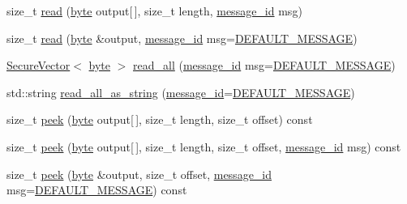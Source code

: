 \begin{DoxyCompactItemize}
\item 
size\-\_\-t \hyperlink{classBotan_1_1Pipe_a6e56c732acd4bd44cecfb92eedd68ddf}{read} (\hyperlink{namespaceBotan_a7d793989d801281df48c6b19616b8b84}{byte} output\mbox{[}$\,$\mbox{]}, size\-\_\-t length, \hyperlink{classBotan_1_1Pipe_a122c19120c1c21f270b6b6225ca9883c}{message\-\_\-id} msg)
\item 
size\-\_\-t \hyperlink{classBotan_1_1Pipe_a9b6aa6652c9c95bfc2e110315a7032c1}{read} (\hyperlink{namespaceBotan_a7d793989d801281df48c6b19616b8b84}{byte} \&output, \hyperlink{classBotan_1_1Pipe_a122c19120c1c21f270b6b6225ca9883c}{message\-\_\-id} msg=\hyperlink{classBotan_1_1Pipe_a75278149a3ca86f19db144049cfa2ed3}{D\-E\-F\-A\-U\-L\-T\-\_\-\-M\-E\-S\-S\-A\-G\-E})
\item 
\hyperlink{classBotan_1_1SecureVector}{Secure\-Vector}$<$ \hyperlink{namespaceBotan_a7d793989d801281df48c6b19616b8b84}{byte} $>$ \hyperlink{classBotan_1_1Pipe_a389294ef471311276912ef8eaf30daaa}{read\-\_\-all} (\hyperlink{classBotan_1_1Pipe_a122c19120c1c21f270b6b6225ca9883c}{message\-\_\-id} msg=\hyperlink{classBotan_1_1Pipe_a75278149a3ca86f19db144049cfa2ed3}{D\-E\-F\-A\-U\-L\-T\-\_\-\-M\-E\-S\-S\-A\-G\-E})
\item 
std\-::string \hyperlink{classBotan_1_1Pipe_adf442bf35a45a7b604903cf758f52772}{read\-\_\-all\-\_\-as\-\_\-string} (\hyperlink{classBotan_1_1Pipe_a122c19120c1c21f270b6b6225ca9883c}{message\-\_\-id}=\hyperlink{classBotan_1_1Pipe_a75278149a3ca86f19db144049cfa2ed3}{D\-E\-F\-A\-U\-L\-T\-\_\-\-M\-E\-S\-S\-A\-G\-E})
\item 
size\-\_\-t \hyperlink{classBotan_1_1Pipe_a48ceb1b846cf689cbc492168d87b27ad}{peek} (\hyperlink{namespaceBotan_a7d793989d801281df48c6b19616b8b84}{byte} output\mbox{[}$\,$\mbox{]}, size\-\_\-t length, size\-\_\-t offset) const 
\item 
size\-\_\-t \hyperlink{classBotan_1_1Pipe_a05d44b2b313392b3bb4a75e3030f6dad}{peek} (\hyperlink{namespaceBotan_a7d793989d801281df48c6b19616b8b84}{byte} output\mbox{[}$\,$\mbox{]}, size\-\_\-t length, size\-\_\-t offset, \hyperlink{classBotan_1_1Pipe_a122c19120c1c21f270b6b6225ca9883c}{message\-\_\-id} msg) const 
\item 
size\-\_\-t \hyperlink{classBotan_1_1Pipe_a268d42146188415a119d89e41abd520c}{peek} (\hyperlink{namespaceBotan_a7d793989d801281df48c6b19616b8b84}{byte} \&output, size\-\_\-t offset, \hyperlink{classBotan_1_1Pipe_a122c19120c1c21f270b6b6225ca9883c}{message\-\_\-id} msg=\hyperlink{classBotan_1_1Pipe_a75278149a3ca86f19db144049cfa2ed3}{D\-E\-F\-A\-U\-L\-T\-\_\-\-M\-E\-S\-S\-A\-G\-E}) const 

\end{DoxyCompactItemize}
